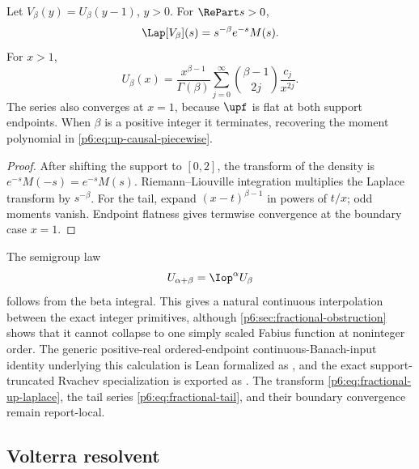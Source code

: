 \documentclass[11pt,oneside]{article}
\theoremstyle{definition}
\theoremstyle{remark}
\newcommand{\1}{\mathbf 1}
\begin{document}
\begin{proposition}
\label{p6:prop:fractional-up-transform}
Let \(V_\beta(y)=U_\beta(y-1)\), \(y>0\).  For \(\RePart s>0\),
\begin{equation}
 \Lap[V_\beta](s)=s^{-\beta}e^{-s}M(s).                   \label{p6:eq:fractional-up-laplace}
\end{equation}
For \(x>1\),
\begin{equation}
 U_\beta(x)=\frac{x^{\beta-1}}{\Gamma(\beta)}
 \sum_{j=0}^{\infty}\binom{\beta-1}{2j}\frac{c_j}{x^{2j}}. \label{p6:eq:fractional-tail}
\end{equation}
The series also converges at \(x=1\), because \(\upf\) is flat at both support
endpoints.  When \(\beta\) is a positive integer it terminates, recovering the moment
polynomial in \eqref{p6:eq:up-causal-piecewise}.
\end{proposition}

\begin{proof}
After shifting the support to \([0,2]\), the transform of the density is
\(e^{-s}M(-s)=e^{-s}M(s)\).  Riemann--Liouville integration multiplies the Laplace
transform by \(s^{-\beta}\).  For the tail, expand
\((x-t)^{\beta-1}\) in powers of \(t/x\); odd moments vanish.  Endpoint flatness gives
termwise convergence at the boundary case \(x=1\).
\end{proof}

The semigroup law
\begin{equation}
 U_{\alpha+\beta}=\Iop^\alpha U_\beta                 \label{p6:eq:fractional-semigroup}
\end{equation}
follows from the beta integral.  This gives a natural continuous interpolation between
the exact integer primitives, although \cref{p6:sec:fractional-obstruction} shows that it
cannot collapse to one simply scaled Fabius function at noninteger order.
The generic positive-real ordered-endpoint continuous-Banach-input identity underlying this
calculation is Lean formalized as , and the exact
support-truncated Rvachev specialization is exported as
.  The transform
\eqref{p6:eq:fractional-up-laplace}, the tail series \eqref{p6:eq:fractional-tail}, and
their boundary convergence remain report-local.

\subsection{Volterra resolvent}
\end{document}

